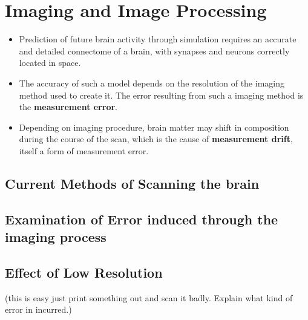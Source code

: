 \section{Imaging and Image Processing}

\begin{itemize}
    \item Prediction of future brain activity through simulation requires an accurate and detailed connectome of a brain, with synapses and neurons correctly located in space.\autocite{bostrom_whole_2008}
    \item The accuracy of such a model depends on the resolution of the imaging method used to create it. The error resulting from such a imaging method is the \textbf{measurement error}. 
    \item Depending on imaging procedure, brain matter may shift in composition during the course of the scan, which is the cause of \textbf{measurement drift}, itself a form of measurement error.
\end{itemize}

\subsection{Current Methods of Scanning the brain}

\subsection[Error induced through noise]{Examination of Error induced through the imaging process}



\subsection[Error induced through low resolution]{Effect of Low Resolution} 
(this is easy just print something out
and scan it badly. Explain what kind of error in incurred.)